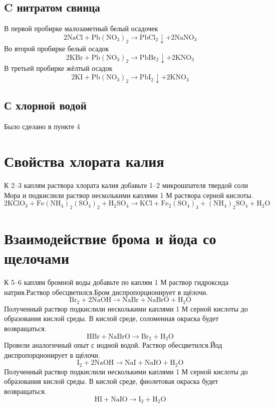 \documentclass[a4paper,12pt]{article}
\begin{document}
\subsection{C нитратом свинца}
В первой пробирке малозаметный белый осадочек
\begin{equation} 
\mathrm{2NaCl + Pb(NO_3)_2  \longrightarrow PbCl_2\downarrow + 2NaNO_3 } 
\end{equation}
Во второй пробирке белый осадок
\begin{equation} 
\mathrm{2KBr + Pb(NO_3)_2  \longrightarrow PbBr_2\downarrow + 2KNO_3 } 
\end{equation}
В третьей пробирке жёлтый осадок
\begin{equation} 
\mathrm{2KI + Pb(NO_3)_2  \longrightarrow PbI_2\downarrow + 2KNO_3 } 
\end{equation}

\subsection{С хлорной водой}
Было сделано в пункте 4
\section{Свойства хлората калия}
К 2–3 каплям раствора хлората калия добавьте 1–2 микрошпателя твердой соли Мора и
подкислили раствор несколькими каплями 1 М раствора серной кислоты.
\begin{equation} 
\mathrm{2KСlO_3 + Fe(NH_4)_2(SO_4)_2 + H_2SO_4 \longrightarrow KCl + Fe_2(SO_4)_3 + (NH_4)_2SO_4 + H_2O } 
\end{equation}

\section{Взаимодействие брома и йода со щелочами}
К 5–6 каплям бромной воды добавьте по каплям 1 М раствор гидроксида натрия.Раствор обесцветился.Бром диспропорционирует в щёлочи. 
\begin{equation} 
\mathrm{Br_2 + 2NaOH \longrightarrow NaBr + NaBrO + H_2O } 
\end{equation}
Полученный раствор подкислили несколькими каплями 1 М серной кислоты до образования
кислой среды. В кислой среде, соломенная окраска будет возвращаться.
\begin{equation} 
\mathrm{HBr + NaBrO \longrightarrow Br_2 + H_2O } 
\end{equation} 
Провели аналогичный опыт с иодной водой. Раствор обесцветился.Йод диспропорционирует в щёлочи.
\begin{equation} 
\mathrm{I_2 + 2NaOH  \longrightarrow  NaI + NaIO + H_2O } 
\end{equation} 
Полученный раствор подкислили несколькими каплями 1 М серной кислоты до образования
кислой среды. В кислой среде, фиолетовая окраска будет возвращаться.
\begin{equation} 
\mathrm{HI + NaIO \longrightarrow I_2 + H_2O } 
\end{equation}
\end{document}
